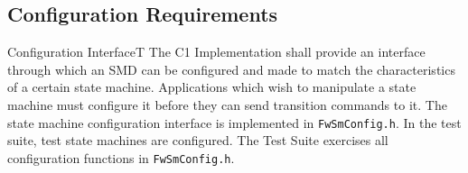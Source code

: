 \documentclass[a4paper,10pt]{article}
\newenvironment{fw_req}[6]
{\addtocounter{subsubsection}{1}
	\hspace{0.2cm}\textbf{FW-\arabic{section}.\arabic{subsection}.\arabic{subsubsection}/#2
	\hspace{0.8cm} #1}
	\vspace{-10pt}
\begin{longtable}{p{2.7cm}P{8.5cm}}
\hline
\textsc{Requirement} & #3 \\
\textsc{Justification} & #4 \\
\textsc{Implementation} & #5  \\ 
\textsc{Verification} & #6  \\
\hline
}
{\end{longtable}}
\begin{document}
\subsection{Configuration Requirements}\label{req:configInterface}

\begin{fw_req}{Configuration Interface}{T}
{The C1 Implementation shall provide an interface through which an SMD can be configured and made to match 
the characteristics of a certain state machine.}
{Applications which wish to manipulate a state machine must configure it before they can send transition commands to it.}
{The state machine configuration interface is implemented in \texttt{FwSmConfig.h}.} 
{In the test suite, test state machines are configured. The Test Suite exercises all configuration 
functions in \texttt{FwSmConfig.h}.}
\end{fw_req}
\end{document}
